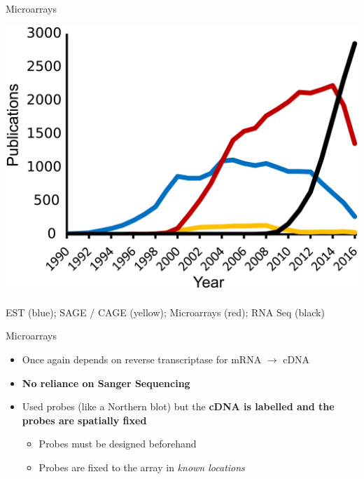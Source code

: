 \documentclass[aspectratio=169,11pt]{beamer}
\begin{document}
\begin{frame}{Microarrays}

	\begin{center}
	\includegraphics[scale=0.5]{figures/timeTrends.png}		
	~\\
	\textcolor[rgb]{0.1,0.4,0.7}{EST (blue)};
	\textcolor[rgb]{0.85,0.65,0.15}{SAGE / CAGE (yellow)};
	\textcolor[rgb]{0.7,0,0.2}{Microarrays (red)};  
	RNA Seq (black) 
	\end{center}

\end{frame}

\begin{frame}{Microarrays}

	\begin{itemize}
		\item Once again depends on reverse transcriptase for mRNA $\rightarrow$ cDNA
		\item \textbf{No reliance on Sanger Sequencing}
		\item Used probes (like a Northern blot) but the \textbf{cDNA is labelled and the probes are spatially fixed}
		\begin{itemize}
			\item Probes must be designed beforehand
			\item Probes are fixed to the array in \textit{known locations}		
		\end{itemize}
	\end{itemize}

\end{frame}
\end{document}
